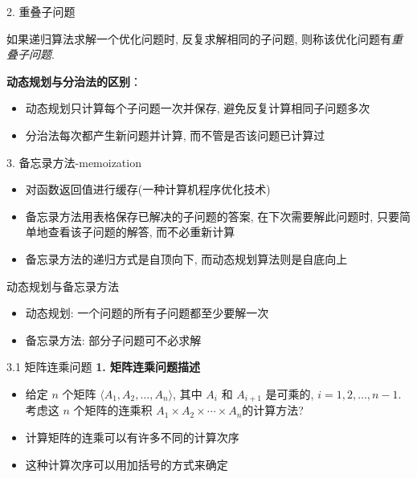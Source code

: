 \documentclass[fontset=fandol,UTF8,fleqn]{beamer}
\begin{document}


\begin{frame}{2. 重叠子问题}

\begin{definition}[重叠子问题]
  如果递归算法求解一个优化问题时, 反复求解相同的子问题, 则称该优化问题有\emph{重叠子问题}.  
\end{definition}\pause

\textbf{动态规划与分治法的区别}： 
\begin{itemize}[<+-|alert@+>]
\item 动态规划只计算每个子问题一次并保存, 避免反复计算相同子问题多次  
\item 分治法每次都产生新问题并计算, 而不管是否该问题已计算过  
\end{itemize}
\end{frame}

\begin{frame}{3. 备忘录方法-memoization}
\begin{itemize}[<+-|alert@+>]
\item 对函数返回值进行缓存(一种计算机程序优化技术)   
\item 备忘录方法用表格保存已解决的子问题的答案, 在下次需要解此问题时, 只要简单地查看该子问题的解答, 而不必重新计算   
\item 备忘录方法的递归方式是自顶向下, 而动态规划算法则是自底向上   
\end{itemize}
\end{frame}

\begin{frame}{动态规划与备忘录方法}
  \begin{itemize}[<+-|alert@+>]
  \item 动态规划: 一个问题的所有子问题都至少要解一次  
  \item 备忘录方法: 部分子问题可不必求解    
  \end{itemize}
\end{frame}

\begin{frame}{3.1 矩阵连乘问题}
\textbf{1. 矩阵连乘问题描述}
  \begin{itemize}[<+-|alert@+>]
\item 给定 $n$ 个矩阵 $\langle A_1, A_2,\ldots,A_n\rangle$, 其中 $A_i$ 和
  $A_{i+1}$ 是可乘的, $i=1,2,\ldots, n-1$. 考虑这 $n$ 个矩阵的连乘积 $A_1\times
  A_2\times \cdots \times A_n$的计算方法? 
\item 计算矩阵的连乘可以有许多不同的计算次序 
\item 这种计算次序可以用加括号的方式来确定 
\end{itemize}
\end{frame}
\end{document}
